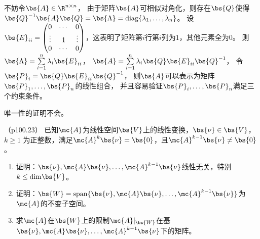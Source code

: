 \documentclass[12pt, a4paper, oneside, UTF8]{ctexbook}
\begin{document}
\begin{solution}
    不妨令$\bs{A}\in \R^{n\times n}$，
    由于矩阵$\bs{A}$可相似对角化，则存在$\bs{Q}$使得
    $\bs{Q}^{-1}\bs{A}\bs{Q}=\bs{\Lambda}=\\
    \mathrm{diag}\{\lambda_1,\ldots,\lambda_n\}$。
    设$\bs{E}_{ii}=\begin{pmatrix}
        0& \cdots &0 \\
        \vdots & 1 & \vdots \\
        0 & \cdots & 0
    \end{pmatrix}$，这表明了矩阵第$i$行第$i$列为$1$，其他元素全为$0$。
    则$\bs{\Lambda}=\sum\limits_{i=1}^n \lambda_i \bs{E}_{ii}$，
    $\bs{A}=\sum\limits_{i=1}^n\lambda_i \bs{Q}\bs{E}_{ii}\bs{Q}^{-1}$，
    令$\bs{P}_i=\bs{Q}\bs{E}_{ii}\bs{Q}^{-1}$，
    则$\bs{A}$可以表示为矩阵$\bs{P}_1,\ldots,\bs{P}_n$的线性组合，
    并且容易验证$\bs{P}_{i},\ldots,\bs{P}_{n}$满足三个约束条件。

    唯一性的证明不会。



\end{solution}

\begin{question}（p100.23）
已知$\mc{A}$为线性空间$\bs{V}$上的线性变换，$\bs{\nu}\in \bs{V}$，$k \geq 1$ 为正整数，满足$\mc{A}^k\bs{\nu}=\bs{0}$，且$\mc{A}^{k-1} \bs{\nu} \neq \bs{0}$。
\begin{enumerate}[label=(\arabic*)]
    \item 证明：$\bs{\nu},\mc{A}\bs{\nu},\ldots,\mc{A}^{k-1}\bs{\nu}$线性无关，特别$k \leq \mathrm{dim}\bs{V}$。
    \item 证明：$\bs{W}=\mathrm{span}\{\bs{\nu},\mc{A}\bs{\nu},\ldots,\mc{A}^{k-1}\bs{\nu}\}$为$\mc{A}$的不变子空间。
    \item 求$\mc{A}$在$\bs{W}$上的限制$\mc{A}|_{\bs{W}}$在基$\bs{\nu},\mc{A}\bs{\nu},\ldots,\mc{A}^{k-1}\bs{\nu}$下的矩阵。
\end{enumerate}

\end{question}
\end{document}
